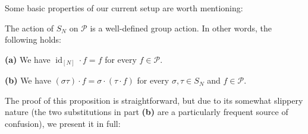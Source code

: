 Some basic properties of our current setup are worth mentioning:

\begin{proposition}
\label{prop.sf.SN-acts}The action of $S_{N}$ on $\mathcal{P}$ is a
well-defined group action. In other words, the following holds: \medskip

\textbf{(a)} We have $\operatorname*{id}\nolimits_{\left[  N\right]  }\cdot
f=f$ for every $f\in\mathcal{P}$. \medskip

\textbf{(b)} We have $\left(  \sigma\tau\right)  \cdot f=\sigma\cdot\left(
\tau\cdot f\right)  $ for every $\sigma,\tau\in S_{N}$ and $f\in\mathcal{P}$.
\end{proposition}

The proof of this proposition is straightforward, but due to its somewhat
slippery nature (the two substitutions in part \textbf{(b)} are a particularly
frequent source of confusion), we present it in full:

